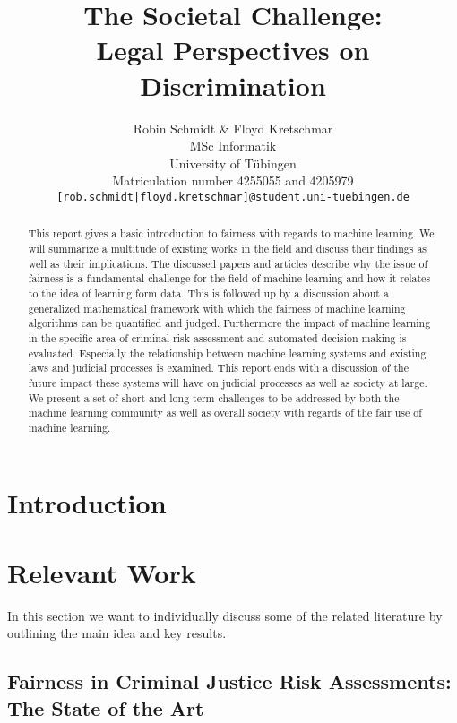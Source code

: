 \documentclass{article}
\title{The Societal Challenge: \\ Legal Perspectives on Discrimination}
\author{%
  Robin Schmidt \& Floyd Kretschmar\\
  MSc Informatik \\
  University of Tübingen\\
  Matriculation number 4255055 and 4205979\\
  \texttt{[rob.schmidt|floyd.kretschmar]@student.uni-tuebingen.de}
}
\begin{document}
\maketitle

\begin{abstract}
  This report gives a basic introduction to fairness with regards to machine learning. 
  We will summarize a multitude of existing works in the field and discuss their findings
  as well as their implications. The discussed papers and articles describe why the issue
  of fairness is a fundamental challenge for the field of machine learning and how it relates
  to the idea of learning form data. This is followed up by a discussion about a generalized mathematical 
  framework with which the fairness of machine learning algorithms can be quantified and judged. 
  Furthermore the impact of machine learning in the specific area of criminal risk assessment 
  and automated decision making is evaluated. Especially the relationship between machine 
  learning systems and existing laws and judicial processes is examined. This report ends 
  with a discussion of the future impact these systems will have on judicial processes as 
  well as society at large. We present a set of short and long term challenges to be 
  addressed by both the machine learning community as well as overall society with 
  regards of the fair use of machine learning.
\end{abstract}

\section{Introduction}
 \label{sec:introduction}

\section{Relevant Work}
In this section we want to individually discuss some of the related literature  \cite{machinebias, Barocas.2016, Berk.2018} by outlining the main idea and key results.

%

\subsection{Fairness in Criminal Justice Risk Assessments: The State of the Art}

\end{document}
